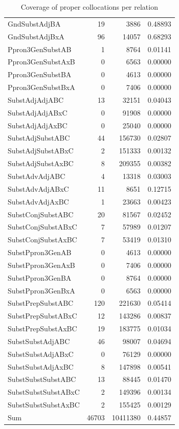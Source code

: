 \begin{table}[t]
\begin{tabular}{|l|r|r| r|}
        GndSubstAdjBA & 19 & 3886 & 0.48893 \\
        GndSubstAdjBxA & 96 & 14057 & 0.68293 \\
        Ppron3GenSubstAB & 1 & 8764 & 0.01141 \\
        Ppron3GenSubstAxB & 0 & 6563 & 0.00000 \\
        Ppron3GenSubstBA & 0 & 4613 & 0.00000 \\
        Ppron3GenSubstBxA & 0 & 7406 & 0.00000 \\
        SubstAdjAdjABC & 13 & 32151 & 0.04043 \\
        SubstAdjAdjABxC & 0 & 91908 & 0.00000 \\
        SubstAdjAdjAxBC & 0 & 25040 & 0.00000 \\
        SubstAdjSubstABC & 44 & 156730 & 0.02807 \\
        SubstAdjSubstABxC & 2 & 151333 & 0.00132 \\
        SubstAdjSubstAxBC & 8 & 209355 & 0.00382 \\
        SubstAdvAdjABC & 4 & 13318 & 0.03003 \\
        SubstAdvAdjABxC & 11 & 8651 & 0.12715 \\
        SubstAdvAdjAxBC & 1 & 23663 & 0.00423 \\
        SubstConjSubstABC & 20 & 81567 & 0.02452 \\
        SubstConjSubstABxC & 7 & 57989 & 0.01207 \\
        SubstConjSubstAxBC & 7 & 53419 & 0.01310 \\
        SubstPpron3GenAB & 0 & 4613 & 0.00000 \\
        SubstPpron3GenAxB & 0 & 7406 & 0.00000 \\
        SubstPpron3GenBA & 0 & 8764 & 0.00000 \\
        SubstPpron3GenBxA & 0 & 6563 & 0.00000 \\
        SubstPrepSubstABC & 120 & 221630 & 0.05414 \\
        SubstPrepSubstABxC & 12 & 143286 & 0.00837 \\
        SubstPrepSubstAxBC & 19 & 183775 & 0.01034 \\
        SubstSubstAdjABC & 46 & 98007 & 0.04694 \\
        SubstSubstAdjABxC & 0 & 76129 & 0.00000 \\
        SubstSubstAdjAxBC & 8 & 147898 & 0.00541 \\
        SubstSubstSubstABC & 13 & 88445 & 0.01470 \\
        SubstSubstSubstABxC & 2 & 149396 & 0.00134 \\
        SubstSubstSubstAxBC & 2 & 155425 & 0.00129 \\
        \hline
        Sum & 46703 & 10411380 & 0.44857 \\
        \hline
    \end{tabular} 
    \caption{Coverage of proper collocations per relation}
    \label{cover_rel_stats}
\end{table}

